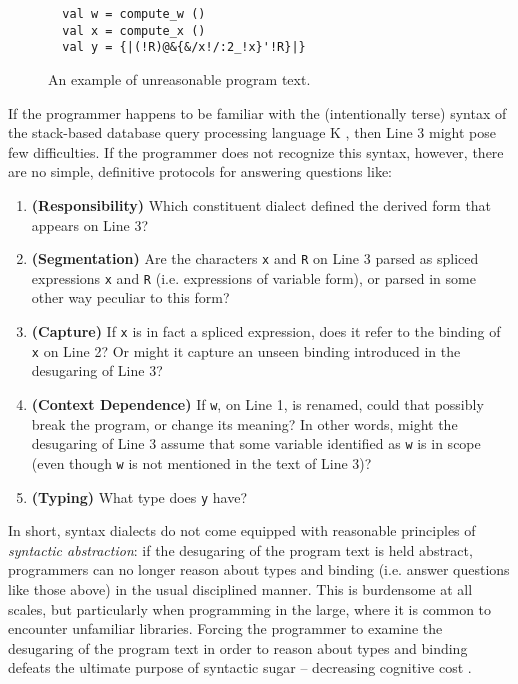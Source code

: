 \documentclass[acmlarge,review,anonymous]{acmart}\settopmatter{printfolios=true}
\newcommand{\li}[1]{\lstinline{#1}}
\begin{document}
\begin{figure}
\begin{lstlisting}
  val w = compute_w ()
  val x = compute_x ()
  val y = {|(!R)@&{&/x!/:2_!x}'!R}|}
\end{lstlisting}
\vspace{-8px}
\caption{An example of unreasonable program text.}
\vspace{-8px}
\label{fig:K-dialect}
\end{figure}

If the programmer happens to be familiar with the (intentionally terse) syntax of the stack-based database query processing language K \cite{Whitney:2001:LOR:376284.375783}, then Line 3 might pose few difficulties. If the programmer does not recognize this syntax, however, there are no simple, definitive protocols for answering questions like:

\begin{enumerate}
\item \textbf{(Responsibility)} Which constituent dialect defined the derived form that appears on Line 3?
\item \textbf{(Segmentation)} Are the characters \li{x} and \li{R} on Line 3 parsed as spliced expressions \li{x} and \li{R} (i.e. expressions of variable form), or parsed in some other way peculiar to this form?
\item \textbf{(Capture)} If \li{x} is in fact a spliced expression, does it refer to the binding of \li{x} on Line 2? Or might it capture an unseen binding introduced in the desugaring of Line 3?
\item \textbf{(Context Dependence)} If \li{w}, on Line 1, is renamed, could that possibly break the program, or change its meaning? In other words, might the desugaring of Line 3 assume that some variable identified as \li{w} is in scope (even though \li{w} is not mentioned in the text of Line 3)?
\item \textbf{(Typing)} What type does \li{y} have?
\end{enumerate}

In short, syntax dialects do not come equipped with reasonable principles of \emph{syntactic abstraction}: if the desugaring of the program text is held abstract, programmers can no longer reason about types and binding (i.e. answer questions like those above) in the usual disciplined manner. This is burdensome at all scales, but particularly when programming in the large, where it is common to encounter unfamiliar libraries. Forcing the programmer to examine the desugaring of the program text in order to reason about types and binding defeats the ultimate purpose of syntactic sugar -- decreasing cognitive cost \cite{Green89}.
\end{document}
